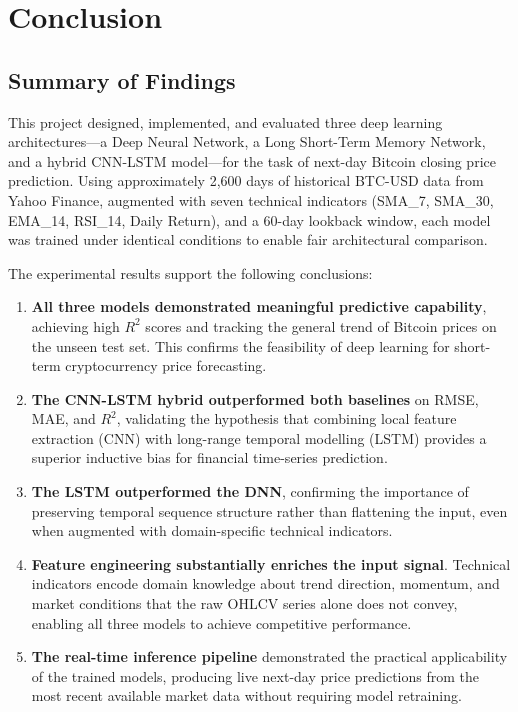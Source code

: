 \documentclass[12pt]{article}
\begin{document}
\section{Conclusion}

\subsection{Summary of Findings}

This project designed, implemented, and evaluated three deep learning architectures---a Deep Neural Network, a Long Short-Term Memory Network, and a hybrid CNN-LSTM model---for the task of next-day Bitcoin closing price prediction. Using approximately 2,600 days of historical BTC-USD data from Yahoo Finance, augmented with seven technical indicators (SMA\_7, SMA\_30, EMA\_14, RSI\_14, Daily Return), and a 60-day lookback window, each model was trained under identical conditions to enable fair architectural comparison.

The experimental results support the following conclusions:

\begin{enumerate}[leftmargin=*]
    \item \textbf{All three models demonstrated meaningful predictive capability}, achieving high $R^2$ scores and tracking the general trend of Bitcoin prices on the unseen test set. This confirms the feasibility of deep learning for short-term cryptocurrency price forecasting.
    \item \textbf{The CNN-LSTM hybrid outperformed both baselines} on RMSE, MAE, and $R^2$, validating the hypothesis that combining local feature extraction (CNN) with long-range temporal modelling (LSTM) provides a superior inductive bias for financial time-series prediction.
    \item \textbf{The LSTM outperformed the DNN}, confirming the importance of preserving temporal sequence structure rather than flattening the input, even when augmented with domain-specific technical indicators.
    \item \textbf{Feature engineering substantially enriches the input signal}. Technical indicators encode domain knowledge about trend direction, momentum, and market conditions that the raw OHLCV series alone does not convey, enabling all three models to achieve competitive performance.
    \item \textbf{The real-time inference pipeline} demonstrated the practical applicability of the trained models, producing live next-day price predictions from the most recent available market data without requiring model retraining.
\end{enumerate}
\end{document}
